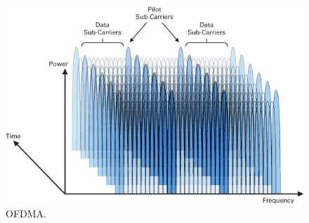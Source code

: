 \begin{figure}
 \centering
 \includegraphics[scale=0.5]{Immagini/ofdma}
 \caption{OFDMA.}
 \label{img:ofdma}
\end{figure}
 
% 
% 


